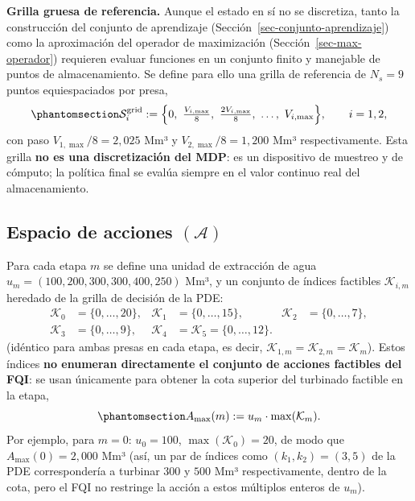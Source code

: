 \documentclass[
  spanish,
  letterpaper,
]{scrreprt}
\theoremstyle{definition}
\theoremstyle{remark}
\begin{document}
\textbf{Grilla gruesa de referencia.} Aunque el estado en sí no se
discretiza, tanto la construcción del conjunto de aprendizaje
(Sección~\ref{sec-conjunto-aprendizaje}) como la aproximación del
operador de maximización (Sección~\ref{sec-max-operador}) requieren
evaluar funciones en un conjunto finito y manejable de puntos de
almacenamiento. Se define para ello una grilla de referencia de
\(N_s=9\) puntos equiespaciados por presa,
\begin{equation}\protect\phantomsection\label{eq-grilla-estado}{\mathcal S_i^{\text{grid}} := \Big\{0,\ \tfrac{V_{i,\max}}{8},\ \tfrac{2V_{i,\max}}{8},\ \dots,\ V_{i,\max}\Big\}, \qquad i=1,2,}\end{equation}
con paso \(V_{1,\max}/8=2{,}025\) Mm³ y \(V_{2,\max}/8=1{,}200\) Mm³
respectivamente. Esta grilla \textbf{no es una discretización del MDP}:
es un dispositivo de muestreo y de cómputo; la política final se evalúa
siempre en el valor continuo real del almacenamiento.

\subsection{\texorpdfstring{Espacio de acciones
\((\mathcal{A})\)}{Espacio de acciones (\textbackslash mathcal\{A\})}}\label{sec-espacio-acciones}

Para cada etapa \(m\) se define una unidad de extracción de agua
\(u_m = (100,200,300,300,400,250)\) Mm³, y un conjunto de índices
factibles \(\mathcal K_{i,m}\) heredado de la grilla de decisión de la
PDE: \[\begin{aligned}
\mathcal{K}_{0} &= \{0,\dots,20\}, &
\mathcal{K}_{1} &= \{0,\dots,15\}, &
\mathcal{K}_{2} &= \{0,\dots,7\}, \\
\mathcal{K}_{3} &= \{0,\dots,9\}, &
\mathcal{K}_{4} &= \mathcal{K}_{5} = \{0,\dots,12\}.
\end{aligned}\] (idéntico para ambas presas en cada etapa, es decir,
\(\mathcal K_{1,m} = \mathcal K_{2,m} = \mathcal K_{m}\)). Estos índices
\textbf{no enumeran directamente el conjunto de acciones factibles del
FQI}: se usan únicamente para obtener la cota superior del turbinado
factible en la etapa,
\begin{equation}\protect\phantomsection\label{eq-accion-max}{A_{\max}(m) := u_m \cdot \max(\mathcal K_{m}).}\end{equation}
Por ejemplo, para \(m=0\): \(u_0=100\), \(\max(\mathcal K_0)=20\), de
modo que \(A_{\max}(0)=2{,}000\) Mm³ (así, un par de índices como
\((k_1,k_2)=(3,5)\) de la PDE correspondería a turbinar \(300\) y
\(500\) Mm³ respectivamente, dentro de la cota, pero el FQI no restringe
la acción a estos múltiplos enteros de \(u_m\)).
\end{document}
